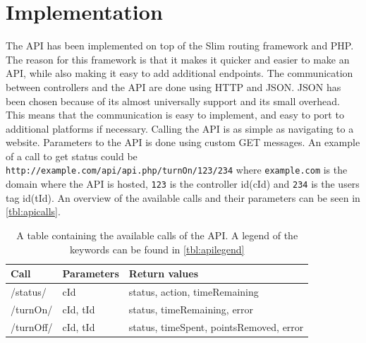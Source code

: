 \section{Implementation}
The API has been implemented on top of the Slim routing framework and PHP. The reason for this framework is that it makes it quicker and easier to make an API, while also making it easy to add additional endpoints. The communication between controllers and the API are done using HTTP and JSON. JSON has been chosen because of its almost universally support and its small overhead. This means that the communication is easy to implement, and easy to port to additional platforms if necessary. Calling the API is as simple as navigating to a website. Parameters to the API is done using custom GET messages. An example of a call to get status could be \texttt{http://example.com/api/api.php/turnOn/123/234} where \texttt{example.com} is the domain where the API is hosted, \texttt{123} is the controller id(cId) and \texttt{234} is the users tag id(tId). An overview of the available calls and their parameters can be seen in \autoref{tbl:apicalls}.
\begin{table}[!h]
\begin{tabular}{| l | l | l |}
\hline
Call & Parameters & Return values \\
\hline
/status/ & cId & status, action, timeRemaining \\
\hline
/turnOn/ & cId, tId & status, timeRemaining, error \\
\hline
/turnOff/ & cId, tId & status, timeSpent, pointsRemoved, error \\
\hline
\end{tabular}
\caption{A table containing the available calls of the API. A legend of the keywords can be found in \autoref{tbl:apilegend}}
\label{tbl:apicalls}
\end{table}

